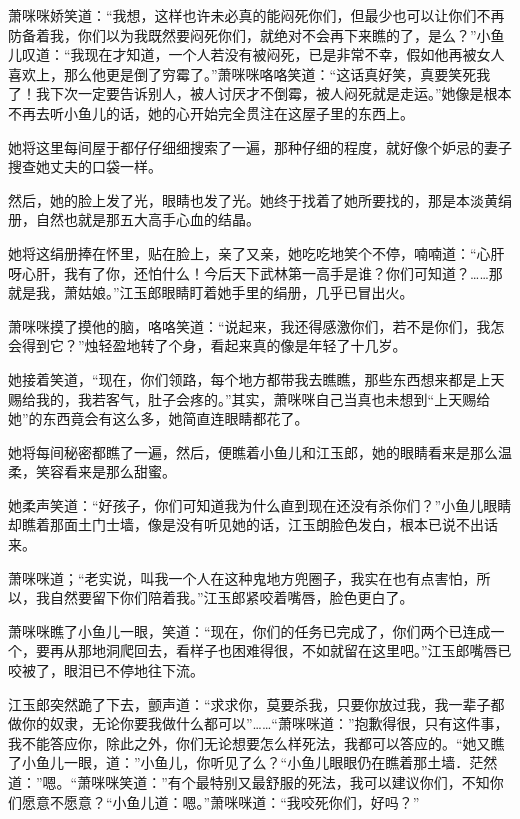 \documentclass[12pt,oneside]{book}
\begin{document}
萧咪咪娇笑道：``我想，这样也许未必真的能闷死你们，但最少也可以让你们不再防备着我，你们以为我既然要闷死你们，就绝对不会再下来瞧的了，是么？''小鱼儿叹道：``我现在才知道，一个人若没有被闷死，已是非常不幸，假如他再被女人喜欢上，那么他更是倒了穷霉了。''萧咪咪咯咯笑道：``这话真好笑，真要笑死我了！我下次一定要告诉别人，被人讨厌才不倒霉，被人闷死就是走运。''她像是根本不再去听小鱼儿的话，她的心开始完全贯注在这屋子里的东西上。

她将这里每间屋于都仔仔细细搜索了一遍，那种仔细的程度，就好像个妒忌的妻子搜查她丈夫的口袋一样。

然后，她的脸上发了光，眼睛也发了光。她终于找着了她所要找的，那是本淡黄绢册，自然也就是那五大高手心血的结晶。

她将这绢册捧在怀里，贴在脸上，亲了又亲，她吃吃地笑个不停，喃喃道：``心肝呀心肝，我有了你，还怕什么！今后天下武林第一高手是谁？你们可知道？\ldots\ldots 那就是我，萧姑娘。''江玉郎眼睛盯着她手里的绢册，几乎已冒出火。

萧咪咪摸了摸他的脑，咯咯笑道：``说起来，我还得感激你们，若不是你们，我怎会得到它？''烛轻盈地转了个身，看起来真的像是年轻了十几岁。

她接着笑道，``现在，你们领路，每个地方都带我去瞧瞧，那些东西想来都是上天赐给我的，我若客气，肚子会疼的。''其实，萧咪咪自己当真也未想到``上天赐给她''的东西竟会有这么多，她简直连眼睛都花了。

她将每间秘密都瞧了一遍，然后，便瞧着小鱼儿和江玉郎，她的眼睛看来是那么温柔，笑容看来是那么甜蜜。

她柔声笑道：``好孩子，你们可知道我为什么直到现在还没有杀你们？''小鱼儿眼睛却瞧着那面土门士墙，像是没有听见她的话，江玉朗脸色发白，根本已说不出话来。

萧咪咪道；``老实说，叫我一个人在这种鬼地方兜圈子，我实在也有点害怕，所以，我自然要留下你们陪着我。''江玉郎紧咬着嘴唇，脸色更白了。

萧咪咪瞧了小鱼儿一眼，笑道：``现在，你们的任务已完成了，你们两个已连成一个，要再从那地洞爬回去，看样子也困难得很，不如就留在这里吧。''江玉郎嘴唇已咬被了，眼泪已不停地往下流。

江玉郎突然跪了下去，颤声道：``求求你，莫要杀我，只要你放过我，我一辈子都做你的奴隶，无论你要我做什么都可以''\ldots\ldots{}``萧咪咪道：''抱歉得很，只有这件事，我不能答应你，除此之外，你们无论想要怎么样死法，我都可以答应的。``她又瞧了小鱼儿一眼，道：''小鱼儿，你听见了么？``小鱼儿眼眼仍在瞧着那土墙．茫然道：''嗯。``萧咪咪笑道：''有个最特别又最舒服的死法，我可以建议你们，不知你们愿意不愿意？``小鱼儿道：嗯。''萧咪咪道：``我咬死你们，好吗？''
\end{document}
